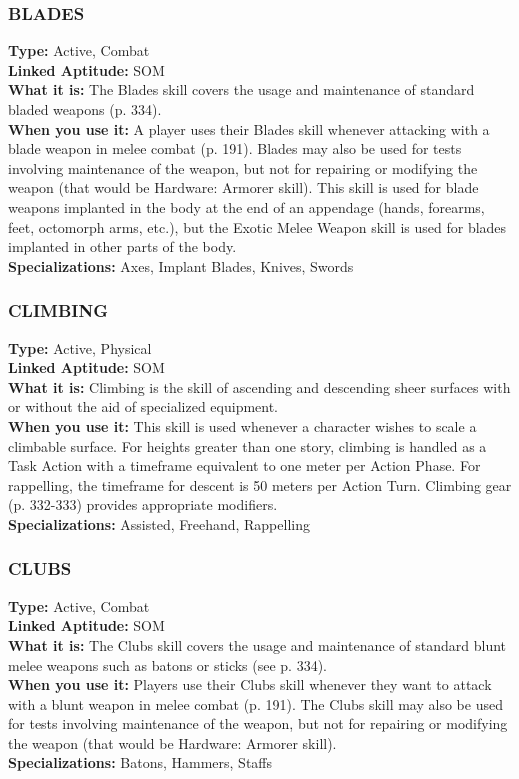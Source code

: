 \subsubsection{BLADES} \textbf{Type:} Active, Combat \\ \textbf{Linked Aptitude:} SOM \\ \textbf{What it is:} The Blades skill covers the usage and maintenance of standard bladed weapons (p. 334). \\ \textbf{When you use it:} A player uses their Blades skill whenever attacking with a blade weapon in melee combat (p. 191). Blades may also be used for tests involving maintenance of the weapon, but not for repairing or modifying the weapon (that would be Hardware: Armorer skill). This skill is used for blade weapons implanted in the body at the end of an appendage (hands, forearms, feet, octomorph arms, etc.), but the Exotic Melee Weapon skill is used for blades implanted in other parts of the body. \\ \textbf{Specializations:} Axes, Implant Blades, Knives, Swords 

\subsubsection{CLIMBING} \textbf{Type:} Active, Physical \\ \textbf{Linked Aptitude:} SOM \\ \textbf{What it is:} Climbing is the skill of ascending and descending sheer surfaces with or without the aid of specialized equipment. \\ \textbf{When you use it:} This skill is used whenever a character wishes to scale a climbable surface. For heights greater than one story, climbing is handled as a Task Action with a timeframe equivalent to one meter per Action Phase. For rappelling, the timeframe for descent is 50 meters per Action Turn. Climbing gear (p. 332-333) provides appropriate modifiers. \\ \textbf{Specializations:} Assisted, Freehand, Rappelling 



\subsubsection{CLUBS} \textbf{Type:} Active, Combat \\ \textbf{Linked Aptitude:} SOM \\ \textbf{What it is:} The Clubs skill covers the usage and maintenance of standard blunt melee weapons such as batons or sticks (see p. 334). \\ \textbf{When you use it:} Players use their Clubs skill whenever they want to attack with a blunt weapon in melee combat (p. 191). The Clubs skill may also be used for tests involving maintenance of the weapon, but not for repairing or modifying the weapon (that would be Hardware: Armorer skill). \\ \textbf{Specializations:} Batons, Hammers, Staffs 

